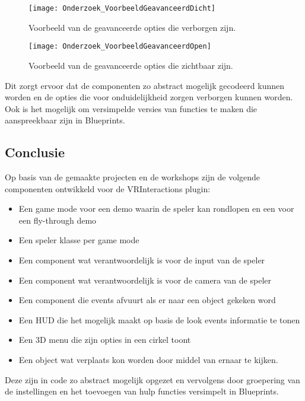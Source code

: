 \begin{figure}[H]
  \centering
    \texttt{[image: Onderzoek\_VoorbeeldGeavanceerdDicht]}
    \caption{Voorbeeld van de geavanceerde opties die verborgen zijn.}
  \label{fig:advOptiesHidden}    
\end{figure}

\begin{figure}[H]
  \centering
    \texttt{[image: Onderzoek\_VoorbeeldGeavanceerdOpen]}
    \caption{Voorbeeld van de geavanceerde opties die zichtbaar zijn.}
  \label{fig:advOptiesVisible}
\end{figure}

Dit zorgt ervoor dat de componenten zo abstract mogelijk gecodeerd kunnen worden en de opties die voor onduidelijkheid zorgen verborgen kunnen worden. Ook is het mogelijk om versimpelde versies van functies te maken die aanspreekbaar zijn in Blueprints.

\subsection{Conclusie}
Op basis van de gemaakte projecten en de workshops zijn de volgende componenten ontwikkeld voor de VRInteractions plugin:

\begin{itemize}
	\item Een game mode voor een demo waarin de speler kan rondlopen en een voor een fly-through demo
	\item Een speler klasse per game mode
	\item Een component wat verantwoordelijk is voor de input van de speler
	\item Een component wat verantwoordelijk is voor de camera van de speler
	\item Een component die events afvuurt als er naar een object gekeken word
	\item Een HUD die het mogelijk maakt op basis de look events informatie te tonen
	\item Een 3D menu die zijn opties in een cirkel toont
	\item Een object wat verplaats kon worden door middel van ernaar te kijken.
\end{itemize}

Deze zijn in code zo abstract mogelijk opgezet en vervolgens door groepering van de instellingen en het toevoegen van hulp functies versimpelt in Blueprints.

